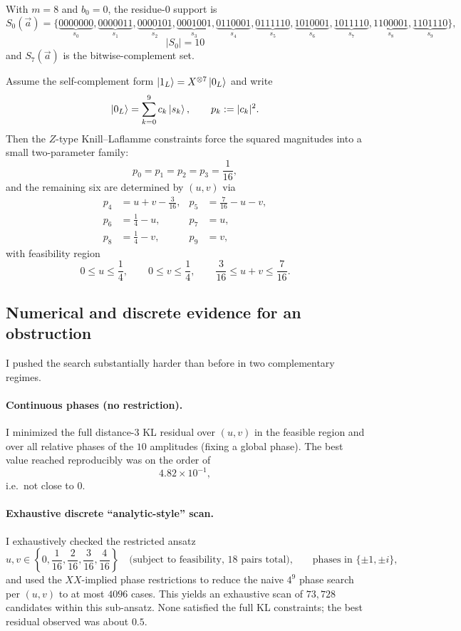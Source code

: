 \documentclass[11pt]{article}
\begin{document}
With \(m=8\) and \(b_0=0\), the residue-\(0\) support is
\[
S_0(\vec a)=\Big\{
\underbrace{0000000}_{s_0},
\underbrace{0000011}_{s_1},
\underbrace{0000101}_{s_2},
\underbrace{0001001}_{s_3},
\underbrace{0110001}_{s_4},
\underbrace{0111110}_{s_5},
\underbrace{1010001}_{s_6},
\underbrace{1011110}_{s_7},
\underbrace{1100001}_{s_8},
\underbrace{1101110}_{s_9}
\Big\},
\]
\[
|S_0|=10
\]
and \(S_7(\vec a)\) is the bitwise-complement set.

Assume the self-complement form \(\ket{1_L}=X^{\otimes 7}\ket{0_L}\) and write
\[
\ket{0_L}=\sum_{k=0}^{9} c_k\ket{s_k},\qquad p_k:=|c_k|^2.
\]
Then the \(Z\)-type Knill--Laflamme constraints force the squared magnitudes into a small two-parameter family:
\[
p_0=p_1=p_2=p_3=\frac{1}{16},
\]
and the remaining six are determined by \((u,v)\) via
\[
\begin{aligned}
p_4&=u+v-\frac{3}{16},&
p_5&=\frac{7}{16}-u-v,\\
p_6&=\frac{1}{4}-u,&
p_7&=u,\\
p_8&=\frac{1}{4}-v,&
p_9&=v,
\end{aligned}
\]
with feasibility region
\[
0\le u\le \frac14,\qquad 0\le v\le \frac14,\qquad \frac{3}{16}\le u+v\le \frac{7}{16}.
\]

\subsection{Numerical and discrete evidence for an obstruction}

I pushed the search substantially harder than before in two complementary regimes.

\paragraph{Continuous phases (no restriction).}
I minimized the full distance-3 KL residual over \((u,v)\) in the feasible region and over all relative phases of the
\(10\) amplitudes (fixing a global phase). The best value reached reproducibly was on the order of
\[
4.82\times 10^{-1},
\]
i.e.\ not close to \(0\).

\paragraph{Exhaustive discrete ``analytic-style'' scan.}
I exhaustively checked the restricted ansatz
\[
u,v\in\left\{0,\frac1{16},\frac2{16},\frac3{16},\frac4{16}\right\}
\quad\text{(subject to feasibility, \(18\) pairs total),}
\qquad
\text{phases in }\{\pm 1,\pm i\},
\]
and used the \(XX\)-implied phase restrictions to reduce the naive \(4^9\) phase search per \((u,v)\) to at most \(4096\) cases.
This yields an exhaustive scan of \(73{,}728\) candidates within this sub-ansatz. None satisfied the full KL constraints;
the best residual observed was about \(0.5\).
\end{document}
